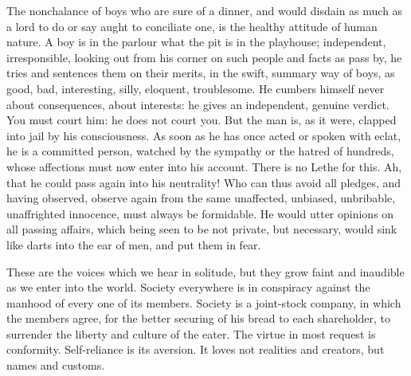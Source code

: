 \documentclass{article}
\begin{document}
The nonchalance of boys who are sure of a dinner, and would disdain as much
as a lord to do or say aught to conciliate one, is the healthy attitude of
human nature. A boy is in the parlour what the pit is in the playhouse;
independent, irresponsible, looking out from his corner on such people and
facts as pass by, he tries and sentences them on their merits, in the swift,
summary way of boys, as good, bad, interesting, silly, eloquent,
troublesome. He cumbers himself never about consequences, about interests:
he gives an independent, genuine verdict. You must court him: he does not
court you. But the man is, as it were, clapped into jail by his
consciousness. As soon as he has once acted or spoken with eclat, he is a
committed person, watched by the sympathy or the hatred of hundreds, whose
affections must now enter into his account. There is no Lethe for this. Ah,
that he could pass again into his neutrality! Who can thus avoid all
pledges, and having observed, observe again from the same unaffected,
unbiased, unbribable, unaffrighted innocence, must always be formidable. He
would utter opinions on all passing affairs, which being seen to be not
private, but necessary, would sink like darts into the ear of men, and put
them in fear.

These are the voices which we hear in solitude, but they grow faint and
inaudible as we enter into the world. Society everywhere is in conspiracy
against the manhood of every one of its members. Society is a joint-stock
company, in which the members agree, for the better securing of his bread to
each shareholder, to surrender the liberty and culture of the eater. The
virtue in most request is conformity. Self-reliance is its aversion. It
loves not realities and creators, but names and customs.
\end{document}
